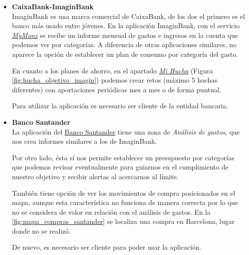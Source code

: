 \begin{itemize}

    \item \textbf{CaixaBank-ImaginBank} \\
    ImaginBank es una marca comercial de CaixaBank, de los dos el primero es el banco más usado entre jóvenes. 
    En la aplicación ImaginBank, con el servicio \href{https://www.imagin.com/app/mymonz}{\textit{MyMonz}} se recibe un informe mensual de gastos e ingresos en la cuenta que podemos ver por categorías. 
    A diferencia de otras aplicaciones similares, no aparece la opción de 
    establecer un plan de consumo por categoría del gasto.

    En cuanto a los planes de ahorro, en el apartado \href{https://www.imagin.com/ahorro/retos-ahorro}{\textit{Mi Hucha}} (Figura \ref{fig:hucha_objetivo_imagin}) podemos crear 
    retos (máximo 5 huchas diferentes) con aportaciones periódicas mes a mes o de forma puntual.

    Para utilizar la aplicación es necesario ser cliente de la entidad bancaria.

    \item \textbf{Banco Santander}\\
    La aplicación del \href{https://www.bancosantander.es/particulares/banca-online/apps/santander}{Banco Santander}
    tiene una zona de \textit{Análisis de gastos}, que nos crea informes similares a los de ImaginBank. 

    Por otro lado, ésta sí nos permite establecer un 
    presupuesto por categorías que podemos revisar eventualmente para guiarnos en el 
    cumplimiento de nuestro objetivo y recibir alertas al acercarnos al límite.

    También tiene opción de ver los movimientos de compra posicionados en el mapa, aunque esta característica no funciona de manera correcta por lo que no se considera de valor en relación con el análisis de gastos. En la  \ref{fig:mapa_compras_santander} se localiza una compra en Barcelona, lugar donde no se realizó.

    De nuevo, es necesario ser cliente para poder usar la aplicación.


\end{itemize}

